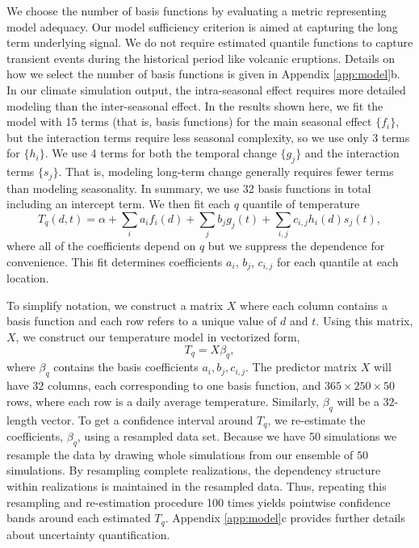 \documentclass{ametsoc}
\begin{document}
We choose the number of basis functions by evaluating a metric representing model adequacy. Our model sufficiency criterion is aimed at capturing the long term underlying signal. We do not require estimated quantile functions to capture transient events during the historical period like volcanic eruptions. Details on how we select the number of basis functions is given in Appendix \ref{app:model}b. In our climate simulation output, the intra-seasonal effect requires more detailed modeling than the inter-seasonal effect. In the results shown here, we fit the model with 15 terms (that is, basis functions) for the main seasonal effect $\{f_i\}$, but the interaction terms require less seasonal complexity, so we use only 3 terms for $\{h_i\}$.  
We use 4 terms for both the temporal change $\{g_j\}$ and the interaction terms $\{s_j\}$. 
That is, modeling long-term change generally requires fewer terms than modeling seasonality. In summary, we use 32 basis functions in total including an intercept term. We then fit each $q$ quantile of temperature %
\begin{equation}
T_q(d, t) = \alpha + \sum_ia_if_i(d) + \sum_jb_j g_j(t) + \sum_{i,j}c_{i,j} h_i(d)s_j(t),
\end{equation}
 where all of the coefficients depend on $q$ but we suppress the dependence for convenience. This fit determines coefficients $a_i$, $b_j$, $c_{i,j}$ for each quantile at each location.

 To simplify notation, we construct a matrix $X$ where each column contains a basis function and each row refers to a unique value of $d$ and $t$. Using this matrix, $X$, we construct our temperature model in vectorized form,
 \begin{equation}
 \label{eq:matrix_version}
 T_q = X\beta_q, 
 \end{equation}
 where $\beta_q$ contains the basis coefficients $a_i, b_j, c_{i,j}$. The predictor matrix $X$ will have $32$ columns, each corresponding to one basis function, and $365 \times 250 \times 50$ rows, where each row is a daily average temperature. Similarly, $\beta_q$ will be a $32$-length vector. To get a confidence interval around $T_q$, we re-estimate the coefficients, $\beta_q$, using a resampled data set. Because we have 50 simulations we resample the data by drawing whole simulations from our ensemble of $50$ simulations. By resampling complete realizations, the dependency structure within realizations is maintained in the resampled data. Thus, repeating this resampling and re-estimation procedure 100 times yields pointwise confidence bands around each estimated $T_q$. Appendix \ref{app:model}c provides further details about uncertainty quantification. 
\end{document}
